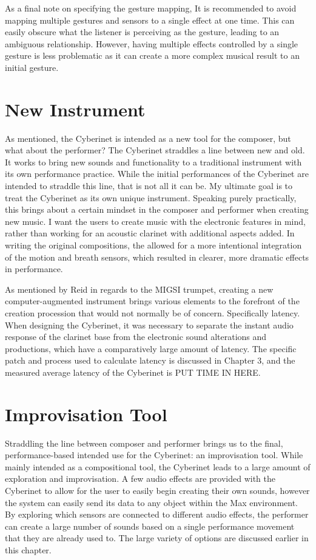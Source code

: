 As a final note on specifying the gesture mapping, It is recommended to avoid mapping multiple gestures and sensors to a single effect at one time. This can easily obscure what the listener is perceiving as the gesture, leading to an ambiguous relationship. However, having multiple effects controlled by a single gesture is less problematic as it can create a more complex musical result to an initial gesture.


\section{New Instrument}

As mentioned, the Cyberinet is intended as a new tool for the composer, but what about the performer? The Cyberinet straddles a line between new and old. It works to bring new sounds and functionality to a traditional instrument with its own performance practice. While the initial performances of the Cyberinet are intended to straddle this line, that is not all it can be. My ultimate goal is to treat the Cyberinet as its own unique instrument. Speaking purely practically, this brings about a certain mindset in the composer and performer when creating new music. I want the users to create music with the electronic features in mind, rather than working for an acoustic clarinet with additional aspects added. In writing the original compositions, the allowed for a more intentional integration of the motion and breath sensors, which resulted in clearer, more dramatic effects in performance.

As mentioned by Reid in regards to the MIGSI trumpet, creating a new computer-augmented instrument brings various elements to the forefront of the creation procession that would not normally be of concern. Specifically latency\cite{reid_2019}. When designing the Cyberinet, it was necessary to separate the instant audio response of the clarinet base from the electronic sound alterations and productions, which have a comparatively large amount of latency. The specific patch and process used to calculate latency is discussed in Chapter 3, and the measured average latency of the Cyberinet is PUT TIME IN HERE.

\section{Improvisation Tool}
Straddling the line between composer and performer brings us to the final, performance-based intended use for the Cyberinet: an improvisation tool. While mainly intended as a compositional tool, the Cyberinet leads to a large amount of exploration and improvisation. A few audio effects are provided with the Cyberinet to allow for the user to easily begin creating their own sounds, however the system can easily send its data to any object within the Max environment. By exploring which sensors are connected to different audio effects, the performer can create a large number of sounds based on a single performance movement that they are already used to. The large variety of options are discussed earlier in this chapter.

